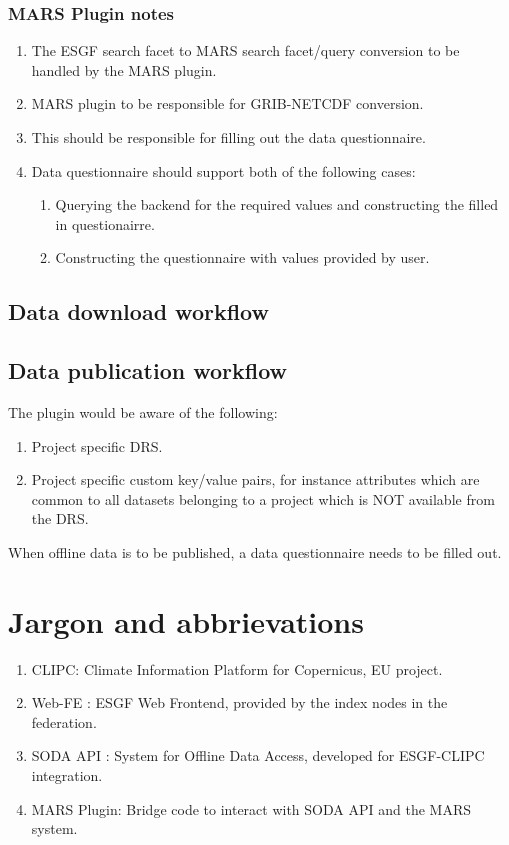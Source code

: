 \documentclass[oneside,12pt]{memoir}
\def\phname{SODA API{ }}
\begin{document}
\subsection{MARS Plugin notes}
\begin{enumerate}
\item The ESGF search facet to MARS search facet/query conversion to be handled by the MARS plugin.
\item MARS plugin to be responsible for GRIB-NETCDF conversion.
\item This should be responsible for filling out the data questionnaire.
\item Data questionnaire should support both of the following cases:
\begin{enumerate}
\item Querying the backend for the required values and constructing the filled in questionairre.
\item Constructing the questionnaire with values provided by user.
\end{enumerate}
\end{enumerate}

\section{Data download workflow}
\section{Data publication workflow}
The plugin would be aware of the following:
\begin{enumerate}
\item Project specific DRS.
\item Project specific custom key/value pairs, for instance attributes which are common to all datasets belonging to a project which is NOT available from the DRS.
\end{enumerate}
When offline data is to be published, a data questionnaire needs to be filled out. 
\appendix
{}
\setcounter{secnumdepth}{0}
\chapter{Jargon and abbrievations}
\begin{enumerate}
\item CLIPC: Climate Information Platform for Copernicus, EU project.
\item Web-FE : ESGF Web Frontend, provided by the index nodes in the federation.
\item \phname: System for Offline Data Access, developed for ESGF-CLIPC integration.
\item MARS Plugin: Bridge code to interact with \phname and the MARS system.
\end{enumerate}
\hypertarget{mymarker}{}
\printindex
\end{document}
